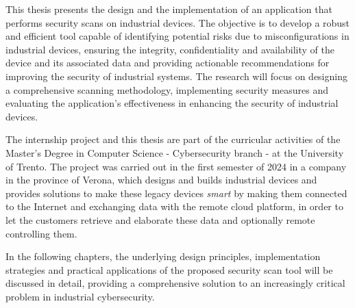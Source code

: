 This thesis presents the design and the implementation of an application that performs security scans on industrial devices. The objective is to develop a robust and efficient tool capable of identifying potential risks due to misconfigurations in industrial devices, ensuring the integrity, confidentiality and availability of the device and its associated data and providing actionable recommendations for improving the security of industrial systems. The research will focus on designing a comprehensive scanning methodology, implementing security measures and evaluating the application's effectiveness in enhancing the security of industrial devices.

The internship project and this thesis are part of the curricular activities of the Master's Degree in Computer Science - Cybersecurity branch - at the University of Trento. The project was carried out in the first semester of 2024 in a company in the province of Verona, which designs and builds industrial devices and provides solutions to make these legacy devices \textit{smart} by making them connected to the Internet and exchanging data with the remote cloud platform, in order to let the customers retrieve and elaborate these data and optionally remote controlling them.

In the following chapters, the underlying design principles, implementation strategies and practical applications of the proposed security scan tool will be discussed in detail, providing a comprehensive solution to an increasingly critical problem in industrial cybersecurity.
